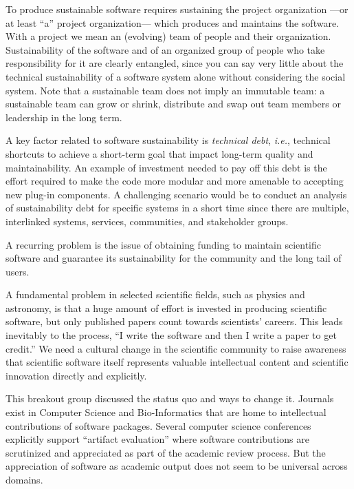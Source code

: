 \documentclass[a4paper,UKenglish]{dagrep}
\newcommand{\ie}{\emph{i.e.},\xspace}
\begin{document}
To produce sustainable software requires sustaining the project organization ---or at least ``a'' project organization--- which produces and maintains the software. With a project we mean an (evolving) team of people and their organization.
Sustainability of the software and of an organized group of people who take responsibility for it are clearly entangled, since you can say very little about the technical sustainability of a software system alone without considering the social system. Note that a sustainable team does not imply an immutable team: a sustainable team can grow or shrink, distribute and swap out team members or leadership in the long term.

A key factor related to software sustainability is \emph{technical debt}, \ie technical shortcuts to achieve a short-term goal that impact long-term quality and maintainability.
An example of investment needed to pay off this debt is the effort required to make the code more modular and more amenable to accepting new plug-in components.
A challenging scenario would be to conduct an analysis of sustainability debt for specific systems in a short time since there are multiple, interlinked systems, services, communities, and stakeholder groups.

A recurring problem is the issue of obtaining funding to maintain scientific software and guarantee its sustainability for the community and the long tail of users.



A fundamental problem in selected scientific fields, such as physics and astronomy, is that a huge amount of effort is invested in producing scientific software, but only published papers count towards scientists' careers. This leads inevitably to the process, ``I write the software and then I write a paper to get credit.'' We need a cultural change in the scientific community to raise awareness that scientific software itself represents valuable intellectual content and scientific innovation directly and explicitly.

This breakout group discussed the status quo and ways to change it. Journals exist in Computer Science and Bio-Informatics that are home to intellectual contributions of software packages. Several computer science conferences explicitly support ``artifact evaluation'' where software contributions are scrutinized and appreciated as part of the academic review process. But the appreciation of software as academic output does not seem to be universal across domains.
\end{document}
